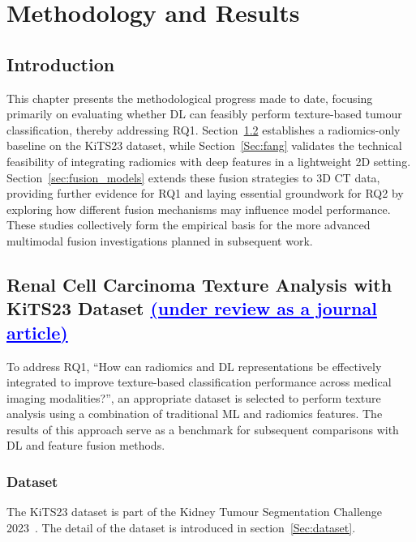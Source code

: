 \documentclass[final,british,a4paper,12pt]{phdthesis}
\begin{document}
            
        
\chapter{Methodology and Results}\label{chap:field}

\section{Introduction}\label{sec:method_intro}
This chapter presents the methodological progress made to date, focusing primarily on evaluating whether DL can feasibly perform texture-based tumour classification, thereby addressing RQ1. Section~\ref{Sec:texture} establishes a radiomics-only baseline on the KiTS23 dataset, while Section~\ref{Sec:fang} validates the technical feasibility of integrating radiomics with deep features in a lightweight 2D setting. Section~\ref{sec:fusion_models} extends these fusion strategies to 3D CT data, providing further evidence for RQ1 and laying essential groundwork for RQ2 by exploring how different fusion mechanisms may influence model performance. These studies collectively form the empirical basis for the more advanced multimodal fusion investigations planned in subsequent work.

\section{Renal Cell Carcinoma Texture Analysis with KiTS23 Dataset \textcolor{blue}{\uline{(under review as a journal article)}}}\label{Sec:texture}
To address RQ1, “How can radiomics and DL representations be effectively integrated to improve texture-based classification performance across medical imaging modalities?”, an appropriate dataset is selected to perform texture analysis using a combination of traditional ML and radiomics features. The results of this approach serve as a benchmark for subsequent comparisons with DL and feature fusion methods.

\subsection{Dataset}\label{subsec:summative_methodology}
The KiTS23 dataset is part of the Kidney Tumour Segmentation Challenge 2023~\cite{kitsIntro}. The detail of the dataset is introduced in section~\ref{Sec:dataset}.
\end{document}
